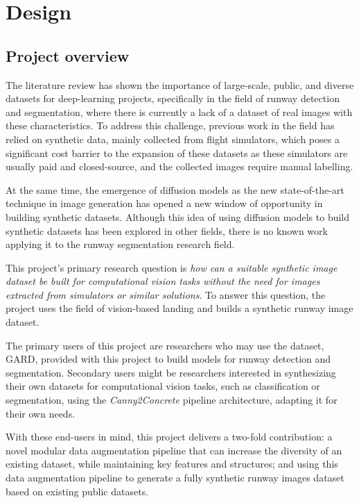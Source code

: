 \chapter{Design}

\section{Project overview}

The literature review has shown the importance of large-scale, public, and diverse datasets for deep-learning projects, specifically in the field of runway detection and segmentation, where there is currently a lack of a dataset of real images with these characteristics. To address this challenge, previous work in the field has relied on synthetic data, mainly collected from flight simulators, which poses a significant cost barrier to the expansion of these datasets as these simulators are usually paid and closed-source, and the collected images require manual labelling.

At the same time, the emergence of diffusion models as the new state-of-the-art technique in image generation has opened a new window of opportunity in building synthetic datasets. Although this idea of using diffusion models to build synthetic datasets has been explored in other fields, there is no known work applying it to the runway segmentation research field.

This project's primary research question is \emph{how can a suitable synthetic
image dataset be built for computational vision tasks without the need for images
extracted from simulators or similar solutions}. To answer this question, the project uses the field of vision-based landing and builds a synthetic runway image dataset.

The primary users of this project are researchers who may use the dataset,
\ac{GARD}, provided with this project to
build models for runway detection and segmentation. Secondary users might be
researchers interested in synthesizing their own datasets for
computational vision tasks, such as classification or segmentation, using the
\emph{Canny2Concrete} pipeline architecture, adapting it for their own needs.

With these end-users in mind, this project delivers a two-fold contribution: a novel modular data augmentation pipeline that can increase the diversity of an existing dataset, while maintaining key features and structures; and using this data augmentation pipeline to generate a fully synthetic runway images dataset based on existing public datasets.

